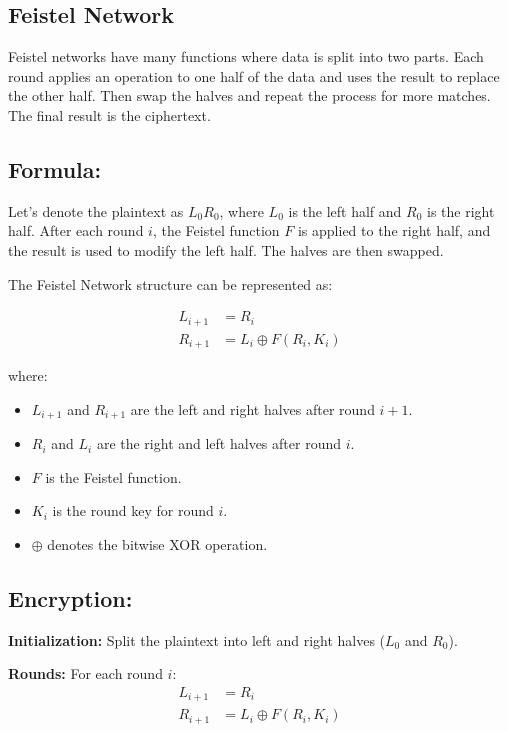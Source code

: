 \documentclass[11pt]{article}
\begin{document}
\subsection{Feistel Network}
Feistel networks have many functions where data is split into two parts. Each round applies an operation to one half of the data and uses the result to replace the other half. Then swap the halves and repeat the process for more matches. The final result is the ciphertext.
\\

\subsection*{Formula:}
Let's denote the plaintext as $L_0R_0$, where $L_0$ is the left half and $R_0$ is the right half. After each round $i$, the Feistel function $F$ is applied to the right half, and the result is used to modify the left half. The halves are then swapped.

The Feistel Network structure can be represented as:

\[
\begin{align*}
L_{i+1} &= R_i \\
R_{i+1} &= L_i \oplus F(R_i, K_i)
\end{align*}
\]

where:
\begin{itemize}
    \item $L_{i+1}$ and $R_{i+1}$ are the left and right halves after round $i+1$.
    \item $R_i$ and $L_i$ are the right and left halves after round $i$.
    \item $F$ is the Feistel function.
    \item $K_i$ is the round key for round $i$.
    \item $\oplus$ denotes the bitwise XOR operation.
\end{itemize}

\subsection*{Encryption:}
\textbf{Initialization:} Split the plaintext into left and right halves ($L_0$ and $R_0$).

\textbf{Rounds:} For each round $i$:
\begin{align*}
L_{i+1} &= R_i \\
R_{i+1} &= L_i \oplus F(R_i, K_i)
\end{align*}
\end{document}

